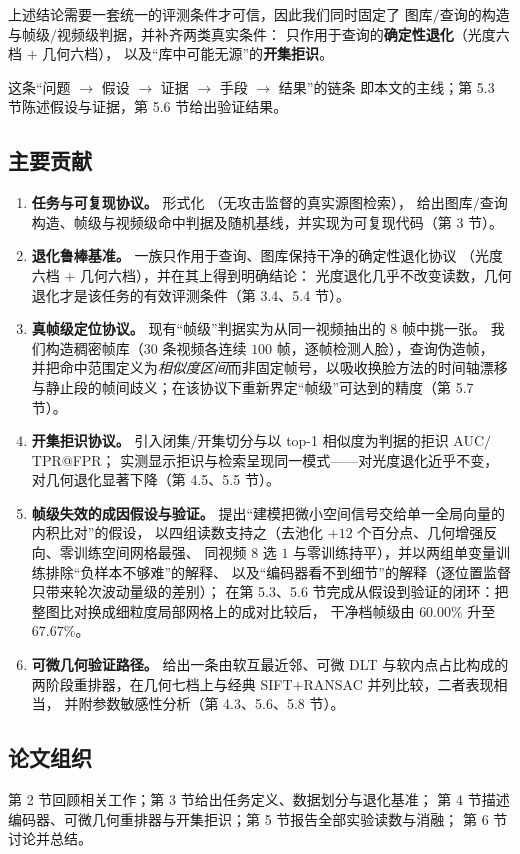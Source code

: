 上述结论需要一套统一的评测条件才可信，因此我们同时固定了
图库$/$查询的构造与帧级$/$视频级判据，并补齐两类真实条件：
只作用于查询的\textbf{确定性退化}（光度六档 $+$ 几何六档），
以及“库中可能无源”的\textbf{开集拒识}。

这条“问题 $\rightarrow$ 假设 $\rightarrow$ 证据 $\rightarrow$ 手段 $\rightarrow$ 结果”的链条
即本文的主线；第 5.3 节陈述假设与证据，第 5.6 节给出验证结果。

\subsection{主要贡献}

\begin{enumerate}[leftmargin=1.6em,itemsep=2pt]
\item \textbf{任务与可复现协议。} 形式化 \aura{}（无攻击监督的真实源图检索），
      给出图库$/$查询构造、帧级与视频级命中判据及随机基线，并实现为可复现代码（第 3 节）。
\item \textbf{退化鲁棒基准。} 一族只作用于查询、图库保持干净的确定性退化协议
      （光度六档 $+$ 几何六档），并在其上得到明确结论：
      光度退化几乎不改变读数，几何退化才是该任务的有效评测条件（第 3.4、5.4 节）。
\item \textbf{真帧级定位协议。} 现有“帧级”判据实为从同一视频抽出的 $8$ 帧中挑一张。
      我们构造稠密帧库（$30$ 条视频各连续 $100$ 帧，逐帧检测人脸），查询伪造帧，
      并把命中范围定义为\emph{相似度区间}而非固定帧号，以吸收换脸方法的时间轴漂移
      与静止段的帧间歧义；在该协议下重新界定“帧级”可达到的精度（第 5.7 节）。
\item \textbf{开集拒识协议。} 引入闭集$/$开集切分与以 top-1 相似度为判据的拒识 AUC$/$TPR@FPR；
      实测显示拒识与检索呈现同一模式——对光度退化近乎不变，对几何退化显著下降（第 4.5、5.5 节）。
\item \textbf{帧级失效的成因假设与验证。} 提出“建模把微小空间信号交给单一全局向量的内积比对”的假设，
      以四组读数支持之（去池化 $+12$ 个百分点、几何增强反向、零训练空间网格最强、
      同视频 $8$ 选 $1$ 与零训练持平），并以两组单变量训练排除“负样本不够难”的解释、
      以及“编码器看不到细节”的解释（逐位置监督只带来轮次波动量级的差别）；
      在第 5.3、5.6 节完成从假设到验证的闭环：把整图比对换成细粒度局部网格上的成对比较后，
      干净档帧级由 $60.00\%$ 升至 $67.67\%$。
\item \textbf{可微几何验证路径。} 给出一条由软互最近邻、可微 DLT 与软内点占比构成的
      两阶段重排器，在几何七档上与经典 SIFT$+$RANSAC 并列比较，二者表现相当，
      并附参数敏感性分析（第 4.3、5.6、5.8 节）。
\end{enumerate}

\subsection{论文组织}

第 2 节回顾相关工作；第 3 节给出任务定义、数据划分与退化基准；
第 4 节描述编码器、可微几何重排器与开集拒识；第 5 节报告全部实验读数与消融；
第 6 节讨论并总结。
